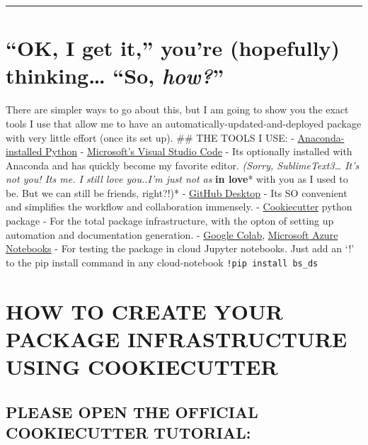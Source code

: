 \documentclass[11pt]{article}
\begin{document}
\begin{center}\rule{0.5\linewidth}{\linethickness}\end{center}

\hypertarget{ok-i-get-it-youre-hopefully-thinking-so-how}{%
\section{\texorpdfstring{``OK, I get it,'' you're (hopefully)
thinking\ldots{} ``So,
\emph{how?}''}{``OK, I get it,'' you're (hopefully) thinking\ldots{} ``So, how?''}}\label{ok-i-get-it-youre-hopefully-thinking-so-how}}

There are simpler ways to go about this, but I am going to show you the
exact tools I use that allow me to have an
automatically-updated-and-deployed package with very little effort (once
its set up). \#\# THE TOOLS I USE: -
\href{https://www.anaconda.com/}{Anaconda-installed Python} -
\href{https://code.visualstudio.com/docs/introvideos/basics}{Microsoft's
Visual Studio Code} - Its optionally installed with Anaconda and has
quickly become my favorite editor. \emph{(Sorry, SublimeText3\ldots{}
It's not you! Its me. I still love you..I'm just not as }\textbf{in
love}* with you as I used to be. But we can still be friends, right?!)*
- \href{https://desktop.github.com/}{GitHub Desktop} - Its SO convenient
and simplifies the workflow and collaboration immensely. -
\href{https://cookiecutter-pypackage.readthedocs.io/en/latest/}{Cookiecutter}
python package - For the total package infrastructure, with the opton of
setting up automation and documentation generation. - \href{}{Google
Colab}, \href{}{Microsoft Azure Notebooks} - For testing the package in
cloud Jupyter notebooks. Just add an `!' to the pip install command in
any cloud-notebook \texttt{!pip\ install\ bs\_ds}

    \hypertarget{how-to-create-your-package-infrastructure-using-cookiecutter}{%
\section{HOW TO CREATE YOUR PACKAGE INFRASTRUCTURE USING
COOKIECUTTER}\label{how-to-create-your-package-infrastructure-using-cookiecutter}}

\hypertarget{please-open-the-official-cookiecutter-tutorial}{%
\subsection{PLEASE OPEN THE OFFICIAL COOKIECUTTER
TUTORIAL:}\label{please-open-the-official-cookiecutter-tutorial}}
\end{document}
